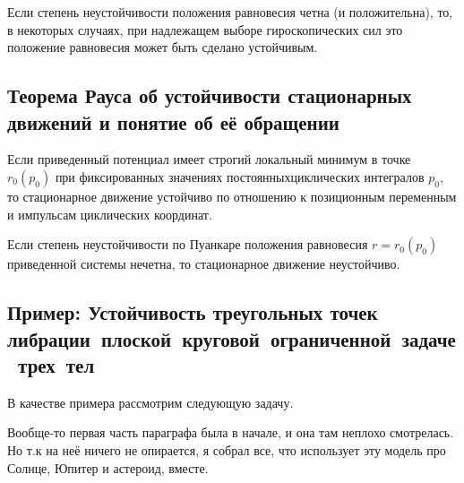 \documentclass[a4paper,12pt]{article}
\begin{document}
\begin{note}
Если степень неустойчивости положения равновесия четна (и положительна), то, в некоторых случаях,
при надлежащем выборе гироскопических сил это положение равновесия может быть сделано устойчивым.
\end{note}
\subsection{Теорема Рауса об устойчивости стационарных движений и понятие об её обращении}
\begin{theorem}
  Если приведенный потенциал имеет строгий локальный минимум в точке
  $r_0(p_0)$ при фиксированных значениях постоянныхциклических
  интегралов $p_0$, то стационарное движение устойчиво по отношению к
  позиционным переменным и импульсам циклических координат.
\end{theorem}
\begin{theorem}
  Если степень неустойчивости по Пуанкаре положения равновесия $r =
  r_0(p_0)$ приведенной системы нечетна, то стационарное движение
  неустойчиво.
\end{theorem}

\subsection{Пример: Устойчивость треугольных точек либрации~плоской~круговой~ограниченной~задаче~трех~тел}
В качестве примера рассмотрим следующую задачу.
\begin{petit}
  Вообще-то первая часть параграфа была в начале, и она там неплохо
  смотрелась. Но т.к на неё ничего не опирается, я собрал все, что
  использует эту модель про Солнце, Юпитер и астероид, вместе.
\end{petit}
\label{sssec:three-solid-problem}
\end{document}
